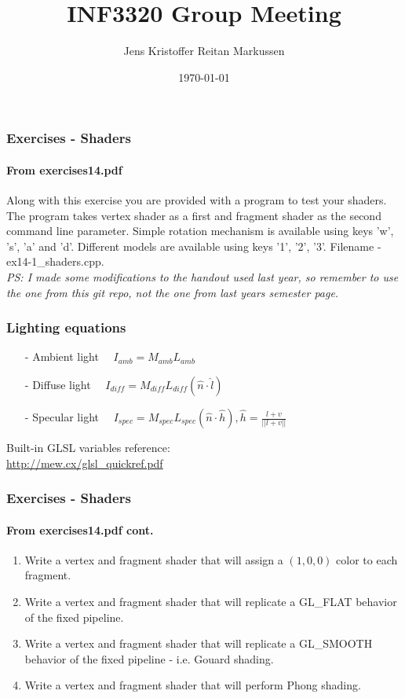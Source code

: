 \documentclass[11pt]{beamer}
\title{INF3320 Group Meeting}
\author{Jens Kristoffer Reitan Markussen}
\date{\today}
\begin{document}
	\begin{frame}
	\frametitle{Exercises - Shaders}
	\framesubtitle{From exercises14.pdf}
	Along with this exercise you are provided with a program to test your shaders. The program takes vertex shader as a first and fragment shader as the second command line parameter.
Simple rotation mechanism is available using keys 'w', 's', 'a' and 'd'. Different models are
available using keys '1', '2', '3'. Filename - ex14-1\_shaders.cpp. \\ \textit{PS: I made some modifications to the handout used last year, so remember to use the one from this git repo, not the one from last years semester page.}

	\end{frame}
	
	\begin{frame}
	\frametitle{Lighting equations}
	\begin{enumerate}
			
	\item[-] Ambient light $\quad I_{amb} = M_{amb}L_{amb}$
	\item[-] Diffuse light $\quad I_{diff} = M_{diff}L_{diff}(\hat{n}\cdot \hat{l})$
	\item[-] Specular light $\quad I_{spec} = M_{spec}L_{spec}(\hat{n}\cdot \hat{h}), \hat{h}=\frac{l+v}{||l+v||}$
\end{enumerate}
	Built-in GLSL variables reference:\\
	\url{http://mew.cx/glsl_quickref.pdf}
	
	\end{frame}		
	
	\begin{frame}
	\frametitle{Exercises - Shaders}
	\framesubtitle{From exercises14.pdf cont.}
	\begin{enumerate}
	\item Write a vertex and fragment shader that will assign a $(1,0,0)$ color to each fragment.
	\item Write a vertex and fragment shader that will replicate a GL\_FLAT behavior of the fixed pipeline.
	\item Write a vertex and fragment shader that will replicate a GL\_SMOOTH behavior of the fixed pipeline - i.e. Gouard shading.	
	\item Write a vertex and fragment shader that will perform Phong shading.
	\end{enumerate}

	\end{frame}
\end{document}
